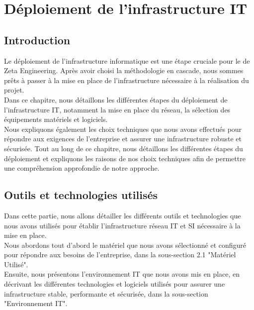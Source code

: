\chapter{Déploiement de l'infrastructure IT}



\section{Introduction}

Le déploiement de l'infrastructure informatique est une étape cruciale pour le de Zeta Engineering. Après avoir choisi la méthodologie en cascade, nous sommes prêts à passer à la mise en place de l'infrastructure nécessaire à la réalisation du projet. \\

Dans ce chapitre, nous détaillons les différentes étapes du déploiement de l'infrastructure IT, notamment la mise en place du réseau, la sélection des équipements matériels et logiciels. \\

Nous expliquons également les choix techniques que nous avons effectués pour répondre aux exigences de l'entreprise et assurer une infrastructure robuste et sécurisée. Tout au long de ce chapitre, nous détaillons les différentes étapes du déploiement et expliquons les raisons de nos choix techniques afin de permettre une compréhension approfondie de notre approche. \\




\section{Outils et technologies utilisés}

Dans cette partie, nous allons détailler les différents outils et technologies que nous avons utilisés pour établir l'infrastructure réseau IT et SI nécessaire à la mise en place.\\

Nous abordons tout d'abord le matériel que nous avons sélectionné et configuré pour répondre aux besoins de l'entreprise, dans la sous-section 2.1 "Matériel Utilisé". \\

Ensuite, nous présentons l'environnement IT que nous avons mis en place, en décrivant les différentes technologies et logiciels utilisés pour assurer une infrastructure stable, performante et sécurisée, dans la sous-section "Environnement IT".  \\

